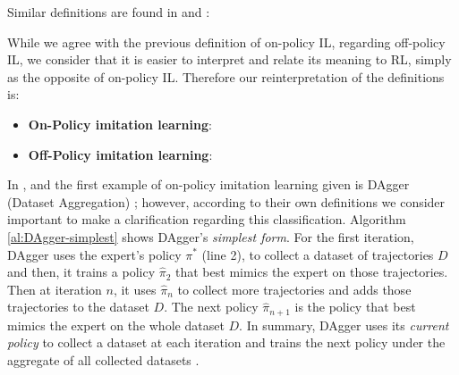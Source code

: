 
\setlength{\parskip}{1em} 

Similar definitions are found in \cite{OtherLaskeydefinitions:2019} and \cite{Anotherdefinitionfromberkeley:2020}:

 
\setlength{\parskip}{1em} 

While we agree with the previous definition of on-policy IL, regarding off-policy IL, we consider that it is easier to interpret and relate its meaning to RL, simply as the opposite of on-policy IL. Therefore our reinterpretation of the definitions is:  

\begin{itemize}
  \item \textbf{On-Policy imitation learning}: 
  
  \item \textbf{Off-Policy imitation learning}: 
  


\end{itemize}


In \cite{DBLP:journals/corr/LaskeyLHLMFG17}, \cite{OtherLaskeydefinitions:2019} and \cite{Osa:2018} the first example of on-policy imitation learning given is DAgger (Dataset  Aggregation) \cite{DAgger-Ross:2011}; however, according to their own definitions we consider important to make a clarification regarding this classification. Algorithm \ref{al:DAgger-simplest} shows DAgger's \textit{simplest form}. For the first iteration, DAgger uses the expert’s policy $\pi^*$ (line 2), to collect a dataset of trajectories $D$ and then, it trains a policy  $\hat{\pi}_2$ that best mimics the expert on those trajectories. Then at iteration $n$, it uses $\hat{\pi}_n$ to collect more trajectories and adds those trajectories to the dataset $D$. The next policy $\hat{\pi}_{n+1}$ is the policy that best mimics the expert on the whole dataset $D$. In summary, DAgger uses its \textit{current policy} to collect a dataset at each iteration and trains the next policy under the aggregate of all collected datasets \cite{DAgger-Ross:2011}.


